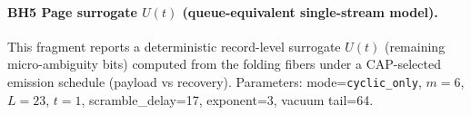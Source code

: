 \paragraph{BH5 Page surrogate $U(t)$ (queue-equivalent single-stream model).} \AuditTag This fragment reports a deterministic record-level surrogate $U(t)$ (remaining micro-ambiguity bits) computed from the folding fibers under a CAP-selected emission schedule (payload vs recovery). Parameters: mode=\texttt{cyclic\_only}, $m=6$, $L=23$, $t=1$, scramble\_delay=17, exponent=3, vacuum tail=64.